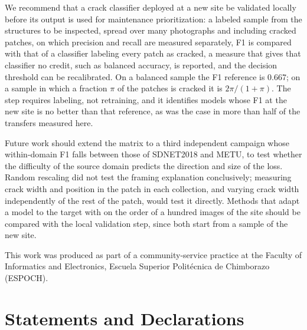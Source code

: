 \documentclass[pdflatex,sn-apa]{sn-jnl}
\newcommand{\pend}[1]{\textcolor{red}{[\textbf{PENDING:} #1]}}
\begin{document}
We recommend that a crack classifier deployed at a new site be validated locally before its output is used for maintenance prioritization: a labeled sample from the structures to be inspected, spread over many photographs and including cracked patches, on which precision and recall are measured separately, F1 is compared with that of a classifier labeling every patch as cracked, a measure that gives that classifier no credit, such as balanced accuracy, is reported, and the decision threshold can be recalibrated. On a balanced sample the F1 reference is 0.667; on a sample in which a fraction $\pi$ of the patches is cracked it is $2\pi/(1+\pi)$. The step requires labeling, not retraining, and it identifies models whose F1 at the new site is no better than that reference, as was the case in more than half of the transfers measured here.

Future work should extend the matrix to a third independent campaign whose within-domain F1 falls between those of SDNET2018 and METU, to test whether the difficulty of the source domain predicts the direction and size of the loss. Random rescaling did not test the framing explanation conclusively; measuring crack width and position in the patch in each collection, and varying crack width independently of the rest of the patch, would test it directly. Methods that adapt a model to the target with on the order of a hundred images of the site \citep{santos2022, chun2024} should be compared with the local validation step, since both start from a sample of the new site.

\backmatter

This work was produced as part of a community-service practice at the Faculty of Informatics and Electronics, Escuela Superior Polit\'ecnica de Chimborazo (ESPOCH).

\section*{Statements and Declarations}
\end{document}
